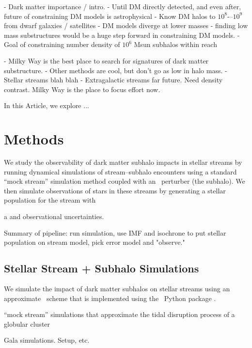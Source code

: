 - Dark matter importance / intro.
- Until DM directly detected, and even after, future of constraining DM models is astrophysical
- Know DM halos to $10^8$-–$10^9$ from dwarf galaxies / satellites
- DM models diverge at lower masses - finding low mass substructures would be a huge step forward in constraining DM models.
- Goal of constraining number density of $10^6$ Msun subhalos within reach

- Milky Way is the best place to search for signatures of dark matter substructure.
- Other methods are cool, but don't go as low in halo mass.
- Stellar streams blah blah
- Extragalactic streams far future. Need density contrast. Milky Way is the place to focus effort now.

In this Article, we explore ...

\section{Methods} \label{sec:methods}

We study the observability of dark matter subhalo impacts in stellar streams by running
dynamical simulations of stream--subhalo encounters using a standard ``mock stream''
simulation method coupled with an \nbody\ perturber (the subhalo).
We then simulate observations of stars in these streams by generating a stellar population for the stream with

a and observational uncertainties.


Summary of pipeline: run simulation, use IMF and isochrone to put stellar population on stream model, pick error model and "observe."

\subsection{Stellar Stream + Subhalo Simulations} \label{sec:streams}

We simulate the impact of dark matter subhalos on stellar streams using an approximate
\nbody\ scheme that is implemented using the \gala\ Python package \citep{gala}.

``mock stream'' simulations that approximate the tidal disruption process of a globular cluster

Gala simulations. Setup, etc.

